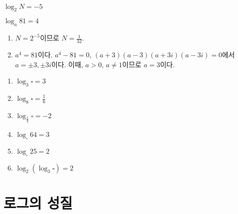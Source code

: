 \documentclass{oblivoir}
\begin{document}
\newpage
%
\label{log12}
\\
\begin{enumerate*}[itemjoin=\tabto{.5\textwidth}]
\item
\(\log_2N=-5\)
\item
\(\log_a81=4\)
\end{enumerate*}
\bigskip
\begin{mdframed}
\begin{enumerate}
\item
\(N=2^{-5}\)이므로 \(N=\frac1{32}\).
\item
\(a^4=81\)이다.
\(a^4-81=0\), \((a+3)(a-3)(a+3i)(a-3i)=0\)에서 \(a=\pm3,\pm3i\)이다.
이때, \(a>0\), \(a\neq1\)이므로 \(a=3\)이다.
\end{enumerate}
\end{mdframed}

%
\begin{enumerate}\label{log13}
\item
\(\log_3\square=3\)
\item
\(\log_8\square=\frac16\)
\item
\(\log_{\frac23}\square=-2\)
\item
\(\log_\square64=3\)
\item
\(\log_\square25=2\)
\item
\(\log_2(\log_3\square)=2\)
\end{enumerate}

\section{로그의 성질}
\end{document}
